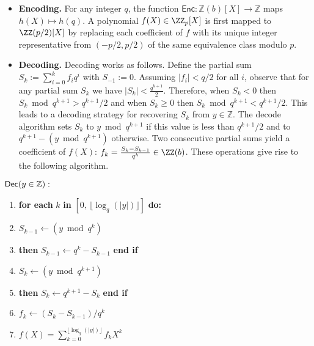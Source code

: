 \begin{itemize} 

\item \textbf{Encoding.}
For any integer $q$, the function $\mathsf{Enc} : \mathbb{Z}(b)[X] \rightarrow \mathbb{Z}$ maps $h(X) \mapsto h(q)$. A polynomial $f(X) \in \ZZ_p[X]$ is first mapped to $\ZZ(p/2)[X]$ by replacing each coefficient of $f$ with its unique integer representative from $(-p/2,p/2)$ of the same equivalence class modulo $p$.  %

\item \textbf{Decoding.}
Decoding works as follows. Define the partial sum $S_k := \sum_{i=0}^k f_i q^i$ with $S_{-1} := 0$. Assuming $|f_i| < q/2$ for all $i$, observe that for any partial sum $S_k$ we have $|S_k|<\frac{q^{k+1}}{2}$. Therefore, when $S_k < 0$ then $S_k \bmod q^{k+1} > q^{k+1}/2$ and when $S_k \geq 0$ then $S_k \bmod q^{k+1} < q^{k+1}/2$. 
This leads to a decoding strategy for recovering $S_k$ from $y \in \mathbb{Z}$. The decode algorithm sets $S_k$ to $y \bmod q^{k+1}$ if this value is less than $q^{k+1}/2$ and to $q^{k+1}- (y \bmod q^{k+1})$ otherwise.
Two consecutive partial sums yield a coefficient of $f(X)$: $f_k = \frac{S_{k} - S_{k-1}}{q^{k}} \in \ZZ(b)$. These operations give rise to the following algorithm.\\
\end{itemize}

 \begin{minipage}{\textwidth}
\begin{mdframed}
\begin{flushleft}
	$\textsf{{Dec}}(y \in \mathbb{Z}):$
	\begin{enumerate}[nolistsep]
	    \item \textbf{for each} $k$ \textbf{in} $[0, \, \lfloor \log_q(|y|)\rfloor]$ \textbf{do:}\\
		\item \pcind[1] $S_{k-1} \gets (y \bmod q^{k})$
		\item \pcind[1]  \textbf{then} $S_{k-1} \gets q^{k}-S_{k-1}$ \textbf{end if}
		\item \pcind[1] $S_k \gets (y \bmod q^{k+1})$
		\item \pcind[1]  \textbf{then} $S_{k} \gets q^{k+1}-S_{k}$ \textbf{end if}
		\item \pcind[1] $f_k \gets (S_{k} - S_{k-1}) / q^k$
		\item \pcreturn $f(X) = \sum_{k=0}^{\lfloor \log_q(|y|)\rfloor} f_k X^k$
	\end{enumerate} 
\end{flushleft}
\end{mdframed}
\end{minipage} \\ 


